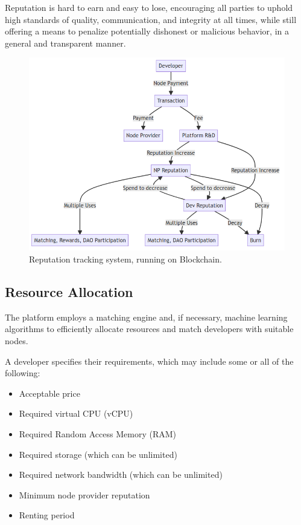 Reputation is hard to earn and easy to lose, encouraging all parties to uphold high standards of quality, communication, and integrity at all times, while still offering a means to penalize potentially dishonest or malicious behavior, in a general and transparent manner.

\begin{figure}[ht]
    \centering
    \includegraphics[width=\columnwidth]{figures/impl-reputation.png}
    \caption{Reputation tracking system, running on Blockchain.}
    \label{fig:reputation-system}
\end{figure}


\subsection{Resource Allocation}
\label{sec:resource_allocation}

The platform employs a matching engine and, if necessary, machine learning algorithms to efficiently allocate resources and match developers with suitable nodes.

A developer specifies their requirements, which may include some or all of the following:
\begin{itemize}
    \item Acceptable price
    \item Required virtual CPU (vCPU)
    \item Required Random Access Memory (RAM)
    \item Required storage (which can be unlimited)
    \item Required network bandwidth (which can be unlimited)
    \item Minimum node provider reputation
    \item Renting period
\end{itemize}

